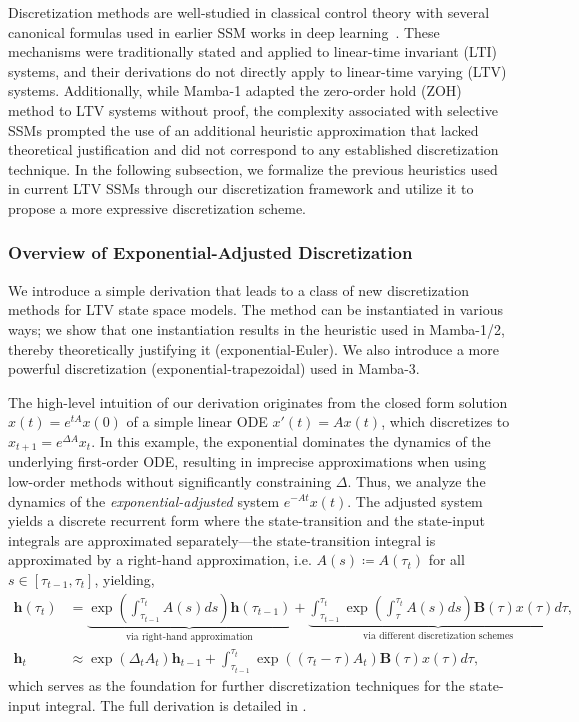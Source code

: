 \documentclass{article}
\newcommand{\citep}{\parencite}
\def\vh{{\bm{h}}}
\def\bB{{\bm{B}}}
\theoremstyle{plain}
\theoremstyle{definition}
\theoremstyle{remark}
\begin{document}
Discretization methods are well-studied in classical control theory with several canonical formulas used in earlier SSM works in deep learning~\citep{S4,S4D,S5}.
These mechanisms were traditionally stated and applied to linear-time invariant (LTI) systems, and their derivations do not directly apply to linear-time varying (LTV) systems.
Additionally, while Mamba-1 adapted the zero-order hold (ZOH) method to LTV systems without proof, the complexity associated with selective SSMs prompted the use of an additional heuristic approximation that lacked theoretical justification and did not correspond to any established discretization technique.
In the following subsection, we formalize the previous heuristics used in current LTV SSMs through our discretization framework and utilize it to propose a more expressive discretization scheme.
\subsubsection{Overview of Exponential-Adjusted Discretization}
We introduce a simple derivation that leads to a class of new discretization methods for LTV state space models. The method can be instantiated in various ways; we show that one instantiation results in the heuristic used in Mamba-1/2, thereby theoretically justifying it (exponential-Euler). We also introduce a more powerful discretization (exponential-trapezoidal) used in Mamba-3.

The high-level intuition of our derivation originates from the closed form solution $x(t) = e^{tA}x(0)$ of a simple linear ODE $x'(t) = Ax(t)$, which discretizes to $x_{t+1} = e^{\Delta A}x_t$.
In this example, the exponential dominates the dynamics of the underlying first-order ODE, resulting in imprecise approximations when using low-order methods without significantly constraining $\Delta$.
Thus, we analyze the dynamics of the \emph{exponential-adjusted} system $e^{-At}x(t)$.
The adjusted system yields a discrete recurrent form where the state-transition and the state-input integrals are approximated separately---the state-transition integral is approximated by a right-hand approximation, i.e. $A(s) \coloneqq A(\tau_t)$ for all $s \in [\tau_{t-1},\tau_t]$, yielding,
\begin{align*}
    \vh(\tau_t) &= \underbrace{\exp\left(\int_{\tau_{t-1}}^{\tau_t}A(s)ds\right)\vh(\tau_{t-1})}_\text{via right-hand approximation} + \underbrace{\int_{\tau_{t-1}}^{\tau_t} \exp\left(\int_{\tau}^{\tau_t}A(s)ds\right)\bB(\tau)x(\tau) d\tau}_\text{via different discretization schemes},
    \\
    \vh_t &\approx \exp\left(\Delta_t A_t\right)\vh_{t-1} + \int_{\tau_{t-1}}^{\tau_t} \exp\left((\tau_t -\tau)A_t\right)\bB(\tau)x(\tau) d\tau,
\end{align*}
which serves as the foundation for further discretization techniques for the state-input integral. The full derivation is detailed in .
\end{document}
